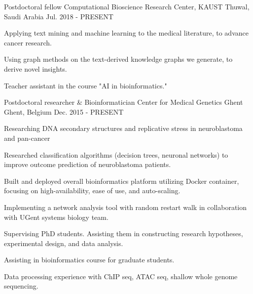 

\begin{cventries}
  \cventry
    {Postdoctoral fellow} %
    {Computational Bioscience Research Center, KAUST} %
    {Thuwal, Saudi Arabia} %
    {Jul. 2018 - PRESENT} %
    {
      \begin{cvitems} %
        \item {Applying text mining and machine learning to the medical literature, to advance cancer research.}
        \item {Using graph methods on the text-derived knowledge graphs we generate, to derive novel insights.}
      \item {Teacher assistant in the course "AI in bioinformatics."}
      \end{cvitems}
    }

  \cventry
    {Postdoctoral researcher \& Bioinformatician} %
    {Center for Medical Genetics Ghent} %
    {Ghent, Belgium} %
    {Dec. 2015 - PRESENT} %
    {
      \begin{cvitems} %
        \item {Researching DNA secondary structures and replicative
            stress in neuroblastoma and pan-cancer}
        \item {Researched classification algorithms (decision trees,
            neuronal networks) to improve outcome prediction of
            neuroblastoma patients.}
      \item {Built and deployed overall bioinformatics platform
          utilizing Docker container, focusing on high-availability,
          ease of use, and auto-scaling.}
      \item {Implementing a network analysis tool with random restart
          walk in collaboration with UGent systems biology team.}
      \item {Supervising PhD students. Assisting them in constructing
          research hypotheses, experimental design, and data
          analysis.}
      \item {Assisting in bioinformatics course for graduate
          students.}
      \item {Data processing experience with ChIP seq, ATAC seq,
          shallow whole genome sequencing.}
      \end{cvitems}
    }


\end{cventries}
